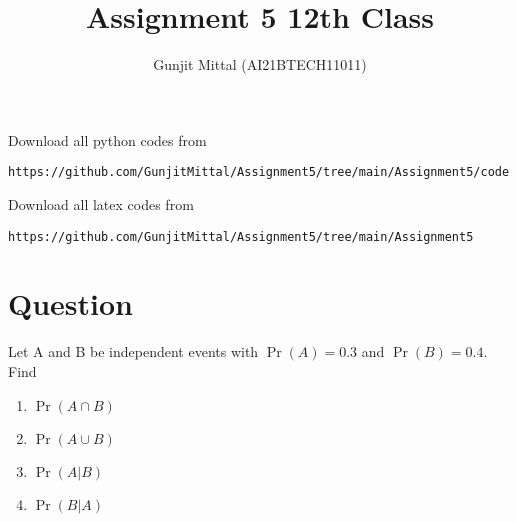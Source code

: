 \documentclass[journal,12pt,twocolumn]{IEEEtran}
\begin{document}
\let\vec\mathbf{}
\def\putbox#1#2#3{\makebox[0in][l]{\makebox[#1][l]{}\raisebox{\baselineskip}[0in][0in]{\raisebox{#2}[0in][0in]{#3}}}}
     \def\rightbox#1{\makebox[0in][r]{#1}}
     \def\centbox#1{\makebox[0in]{#1}}
     \def\topbox#1{\raisebox{-\baselineskip}[0in][0in]{#1}}
     \def\midbox#1{\raisebox{-0.5\baselineskip}[0in][0in]{#1}}
\vspace{3cm}
\title{Assignment 5 12th Class}
\author{Gunjit Mittal (AI21BTECH11011)}
\maketitle
Download all python codes from 
\begin{lstlisting}
https://github.com/GunjitMittal/Assignment5/tree/main/Assignment5/code
\end{lstlisting}
Download all latex codes from 
\begin{lstlisting}
https://github.com/GunjitMittal/Assignment5/tree/main/Assignment5
\end{lstlisting} 
\section{Question}
Let A and B be independent events with $\Pr(A) = 0.3$ and $\Pr(B) = 0.4$. Find
\begin{enumerate}[label= (\roman{enumi})]
    \item $\Pr(A \cap  B)$ 
    \item $\Pr(A \cup  B)$
    \item $\Pr(A|B)$
    \item $\Pr(B|A)$
\end{enumerate}
\end{document}
